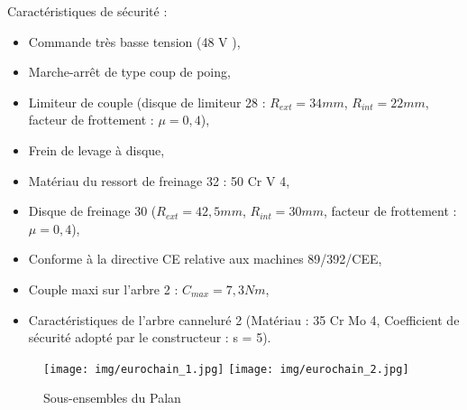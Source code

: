 Caractéristiques de sécurité :
\begin{itemize}
 \item Commande très basse tension (48 V ),
 \item Marche-arrêt de type coup de poing,
 \item Limiteur de couple (disque de limiteur 28 : $R_{ext}=34mm$, $R_{int}=22mm$, facteur de frottement : $\mu=0,4$),
 \item Frein de levage à disque,
 \item Matériau du ressort de freinage 32 : 50 Cr V 4,
 \item Disque de freinage 30 ($R_{ext}=42,5 mm$, $R_{int}=30mm$, facteur de frottement : $\mu=0,4$),
 \item Conforme à la directive CE relative aux machines 89/392/CEE,
 \item Couple maxi sur l'arbre 2 : $C_{max}=7,3Nm$,
 \item Caractéristiques de l'arbre canneluré 2 (Matériau : 35 Cr Mo 4, Coefficient de sécurité adopté par le constructeur : s = 5).
\end{itemize} 

\newpage


\begin{figure}[!h]
 \centering\texttt{[image: img/eurochain\_1.jpg]}
 \centering\texttt{[image: img/eurochain\_2.jpg]}
 \caption{Sous-ensembles du Palan}
 \label{fig5}
\end{figure}


